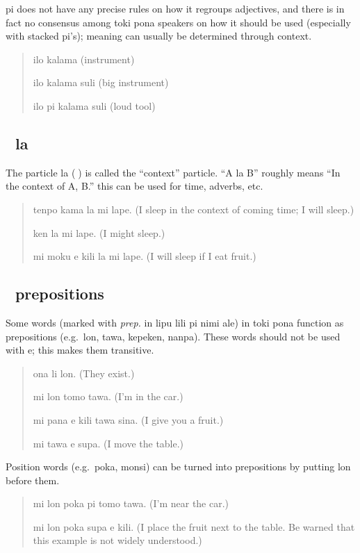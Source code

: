 \documentclass[statementpaper,oneside,article,14pt]{memoir}
\begin{document}
pi does not have any precise rules on how it regroups adjectives, and there is
in fact no consensus among toki pona speakers on how it should be used (especially 
with stacked pi's); meaning can usually be determined through context.

\begin{quote}
  ilo kalama (instrument)

  ilo kalama suli (big instrument)

  ilo pi kalama suli (loud tool)
\end{quote}
\subsection{{\sitpon󱤡} la}

\noindent The particle la ({\sitpon󱤡}) is called the ``context'' particle. 
``A la B'' roughly means ``In the context of A, B.'' this can be used for time, adverbs, etc.

\begin{quote}
  tenpo kama la mi lape. (I sleep in the context of coming time; I will sleep.)

  ken la mi lape. (I might sleep.)

  mi moku e kili la mi lape. (I will sleep if I eat fruit.)
\end{quote}

\subsection{{\sitpon󱤬} prepositions}

\noindent Some words (marked with \textit{prep.} in lipu lili pi nimi ale) in toki pona 
function as prepositions (e.g.\ lon, tawa, kepeken, nanpa). These words
should not be used with e; this makes them transitive.

\begin{quote}
  ona li lon. (They exist.)

  mi lon tomo tawa. (I'm in the car.)

  mi pana e kili tawa sina. (I give you a fruit.)

  mi tawa e supa. (I move the table.)
\end{quote}

\noindent Position words (e.g.\ poka, monsi) can be turned into prepositions by putting lon before them.

\begin{quote}
  mi lon poka pi tomo tawa. (I'm near the car.)

  mi lon poka supa e kili. (I place the fruit next to the table. Be warned that this example is not widely understood.)
\end{quote}
\end{document}
